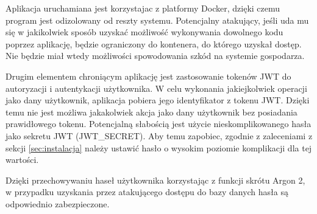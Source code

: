 \documentclass[a4paper,twoside,12pt]{book}
\begin{document}
Aplikacja uruchamiana jest korzystajac z platformy Docker, dzięki czemu program jest
odizolowany od reszty systemu. Potencjalny atakujący, jeśli uda mu się w jakikolwiek sposób
uzyskać możliwość wykonywania dowolnego kodu poprzez aplikację, będzie ograniczony do
kontenera, do którego uzyskał dostęp. Nie będzie miał wtedy możliwości spowodowania
szkód na systemie gospodarza.

Drugim elementem chroniącym aplikację jest zastosowanie tokenów JWT do autoryzacji i autentykacji
użytkownika. W celu wykonania jakiejkolwiek operacji jako dany użytkownik, aplikacja pobiera jego
identyfikator z tokenu JWT. Dzięki temu nie jest możliwa jakakolwiek akcja jako dany użytkownik
bez posiadania prawidłowego tokenu. Potencjalną słabością jest użycie nieskomplikowanego hasła 
jako sekretu JWT (JWT\_SECRET). Aby temu zapobiec, zgodnie z zaleceniami z 
sekcji \ref{sec:instalacja} należy ustawić hasło o wysokim poziomie komplikacji dla tej wartości.

Dzięki przechowywaniu haseł użytkownika korzystając z funkcji skrótu Argon 2, w przypadku uzyskania
przez atakującego dostępu do bazy danych hasła są odpowiednio zabezpieczone. 

%
%
%
%
%        
\end{document}
